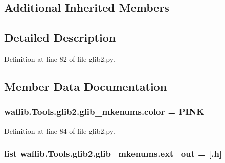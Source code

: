 \subsection*{Additional Inherited Members}


\subsection{Detailed Description}


Definition at line 82 of file glib2.\+py.



\subsection{Member Data Documentation}
\subsubsection[{\texorpdfstring{color}{color}}]{ waflib.\+Tools.\+glib2.\+glib\+\_\+mkenums.\+color = \textquotesingle{}P\+I\+NK\textquotesingle{}\hspace{0.3cm}{\ttfamily [static]}}\hypertarget{classwaflib_1_1_tools_1_1glib2_1_1glib__mkenums_a78f97f7a6d8d04598d22f085ac01487e}{}\label{classwaflib_1_1_tools_1_1glib2_1_1glib__mkenums_a78f97f7a6d8d04598d22f085ac01487e}


Definition at line 84 of file glib2.\+py.

\subsubsection[{\texorpdfstring{ext\+\_\+out}{ext_out}}]{\setlength{\rightskip}{0pt plus 5cm}list waflib.\+Tools.\+glib2.\+glib\+\_\+mkenums.\+ext\+\_\+out = \mbox{[}\textquotesingle{}.h\textquotesingle{}\mbox{]}\hspace{0.3cm}{\ttfamily [static]}}\hypertarget{classwaflib_1_1_tools_1_1glib2_1_1glib__mkenums_ae8151e44c88ba599cf8bdadb7e14f74c}{}\label{classwaflib_1_1_tools_1_1glib2_1_1glib__mkenums_ae8151e44c88ba599cf8bdadb7e14f74c}


